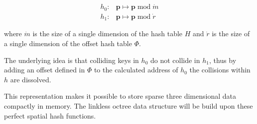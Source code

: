 \begin{align*}
  \mathit{h}_0:& \mathbf{p} \mapsto \mathbf{p} \operatorname{mod} \dot{m} \\
  \mathit{h}_1:& \mathbf{p} \mapsto \mathbf{p} \operatorname{mod} \dot{r}
\end{align*}

\noindent where $\dot{m}$ is the size of a single dimension of the hash table $H$ and
$\dot{r}$ is the size of a single dimension of the offset hash table $\Phi$.

The underlying idea is that colliding keys in $\mathit{h}_0$ do not collide in
$\mathit{h}_1$, thus by adding an offset defined in $\Phi$ to the calculated
address of $\mathit{h}_0$ the collisions within $\mathit{h}$ are dissolved.

This representation makes it possible to store sparse three dimensional data
compactly in memory. The linkless octree data structure will be build upon these
perfect spatial hash functions.







